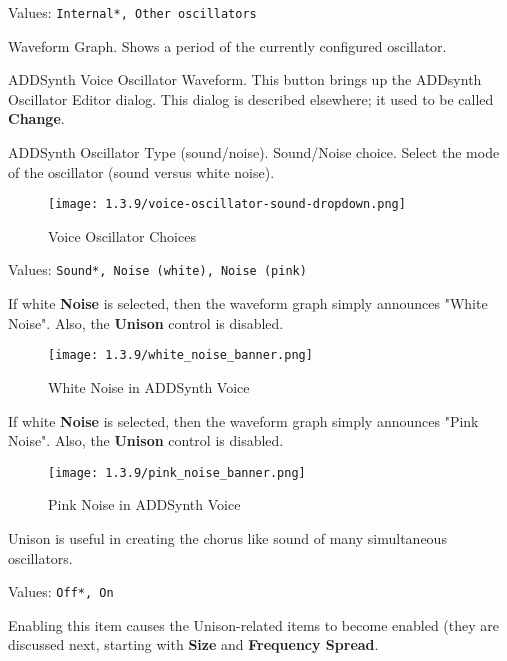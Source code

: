    Values: \texttt{Internal*, Other oscillators}

   Waveform Graph.
   Shows a period of the currently configured oscillator.

   ADDSynth Voice Oscillator Waveform.
   This button brings up the ADDsynth Oscillator Editor dialog.
   This dialog is described elsewhere; it used to be called
   \textbf{Change}.

   ADDSynth Oscillator Type (sound/noise).
   Sound/Noise choice.
   Select the mode of the oscillator (sound versus white noise).

\begin{figure}[H]
   \centering 
   \texttt{[image: 1.3.9/voice-oscillator-sound-dropdown.png]}
   \caption{Voice Oscillator Choices}
   \label{fig:voice_oscillator_choices}
\end{figure}

   Values: \texttt{Sound*, Noise (white), Noise (pink)}

   If white \textbf{Noise} is selected, then the waveform graph simply announces
   "White Noise".  Also, the \textbf{Unison} control is
   disabled.

\begin{figure}[H]
   \centering 
   \texttt{[image: 1.3.9/white\_noise\_banner.png]}
   \caption{White Noise in ADDSynth Voice}
   \label{fig:voice_oscillator_white_noise}
\end{figure}

   If white \textbf{Noise} is selected, then the waveform graph simply announces
   "Pink Noise".  Also, the \textbf{Unison} control is
   disabled.

\begin{figure}[H]
   \centering 
   \texttt{[image: 1.3.9/pink\_noise\_banner.png]}
   \caption{Pink Noise in ADDSynth Voice}
   \label{fig:voice_oscillator_pink_noise}
\end{figure}

   Unison is useful in creating the chorus like sound of many simultaneous
   oscillators.

   Values: \texttt{Off*, On}

   Enabling this item causes the Unison-related items to become
   enabled (they are discussed next, starting with \textbf{Size}
   and \textbf{Frequency Spread}.

